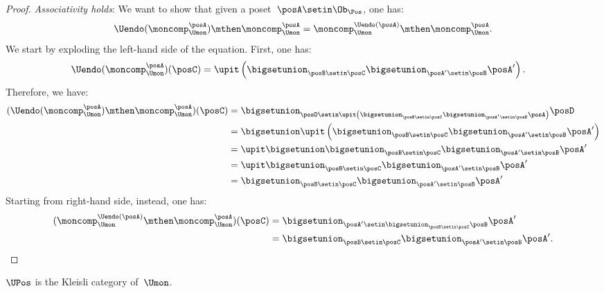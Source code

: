 \begin{proof}
    \emph{Associativity holds}: We want to show that given a poset~$\posA\setin \Ob_\Pos$, one has:
    \begin{equation}
        \Uendo(\moncomp_{\Umon}^{\posA})\mthen \moncomp_{\Umon}^{\posA}= \moncomp_{\Umon}^{\Uendo(\posA)}\mthen \moncomp_{\Umon}^{\posA}.
    \end{equation}
    We start by exploding the left-hand side of the equation.
    First, one has:
    \begin{equation*}
        \begin{aligned}
            \Uendo(\moncomp_{\Umon}^{\posA})(\posC) & =\upit \left( \bigsetunion_{\posB\setin \posC}\bigsetunion_{\posA'\setin \posB} \posA'\right).
        \end{aligned}
    \end{equation*}
    Therefore, we have:
    \begin{equation*}
        \begin{aligned}
            (\Uendo(\moncomp_{\Umon}^{\posA})\mthen \moncomp_{\Umon}^{\posA})(\posC)
             & =\bigsetunion_{\posD \setin \upit \left( \bigsetunion_{\posB\setin \posC}\bigsetunion_{\posA'\setin \posB} \posA\right)} \posD \\
             & =\bigsetunion \upit \left( \bigsetunion_{\posB\setin \posC}\bigsetunion_{\posA'\setin \posB} \posA'\right) \\
             & =\upit \bigsetunion \bigsetunion_{\posB\setin \posC}\bigsetunion_{\posA'\setin \posB} \posA' \\
             & =\upit  \bigsetunion_{\posB\setin \posC}\bigsetunion_{\posA'\setin \posB} \posA' \\
             & = \bigsetunion_{\posB\setin \posC}\bigsetunion_{\posA'\setin \posB} \posA'
        \end{aligned}
    \end{equation*}
    Starting from right-hand side, instead, one has:
    \begin{equation*}
        \begin{aligned}
            (\moncomp_{\Umon}^{\Uendo(\posA)}\mthen \moncomp_{\Umon}^{\posA})(\posC)
             & =\bigsetunion_{\posA'\setin \bigsetunion_{\posB\setin \posC}\posB}\posA' \\
             & =\bigsetunion_{\posB\setin \posC}\bigsetunion_{\posA'\setin \posB} \posA'.
        \end{aligned}
    \end{equation*}
\end{proof}

\begin{lemma}
    \label{lem:uposkleisli}
    $\UPos$ is the Kleisli category of~$\Umon$.
\end{lemma}
